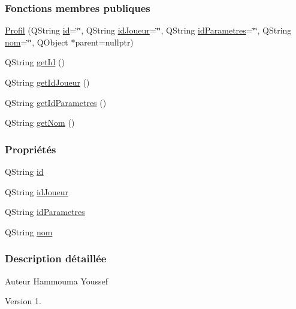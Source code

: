\subsubsection*{Fonctions membres publiques}
\begin{DoxyCompactItemize}
\item 
\hyperlink{class_profil_a4a208a6e5cf119025899b4ec1f3a8e08}{Profil} (Q\+String \hyperlink{class_profil_ac2a62326a3156d5e67011d3dcc063e40}{id}=\char`\"{}\char`\"{}, Q\+String \hyperlink{class_profil_a0d8277364c321a3797f91e3c32dbe47f}{id\+Joueur}=\char`\"{}\char`\"{}, Q\+String \hyperlink{class_profil_a2cdcb0b7614e783ba20ae93eaefebd0c}{id\+Parametres}=\char`\"{}\char`\"{}, Q\+String \hyperlink{class_profil_a919585bdd5c7e7382e6a25c5152d0ca3}{nom}=\char`\"{}\char`\"{}, Q\+Object $\ast$parent=nullptr)
\item 
Q\+String \hyperlink{class_profil_aa51afb45d2062ef33145b21952e7d32a}{get\+Id} ()
\item 
Q\+String \hyperlink{class_profil_aa54d7307013204c361643f019bb924a9}{get\+Id\+Joueur} ()
\item 
Q\+String \hyperlink{class_profil_a806de0fed3f11021eb5294b93efd721d}{get\+Id\+Parametres} ()
\item 
Q\+String \hyperlink{class_profil_a14d2e1976d9e4f5eecfea9347a7647b0}{get\+Nom} ()
\end{DoxyCompactItemize}
\subsubsection*{Propriétés}
\begin{DoxyCompactItemize}
\item 
Q\+String \hyperlink{class_profil_ac2a62326a3156d5e67011d3dcc063e40}{id}
\item 
Q\+String \hyperlink{class_profil_a0d8277364c321a3797f91e3c32dbe47f}{id\+Joueur}
\item 
Q\+String \hyperlink{class_profil_a2cdcb0b7614e783ba20ae93eaefebd0c}{id\+Parametres}
\item 
Q\+String \hyperlink{class_profil_a919585bdd5c7e7382e6a25c5152d0ca3}{nom}
\end{DoxyCompactItemize}


\subsubsection{Description détaillée}
\begin{DoxyAuthor}{Auteur}
Hammouma Youssef
\end{DoxyAuthor}
\begin{DoxyVersion}{Version}
1. 
\end{DoxyVersion}


